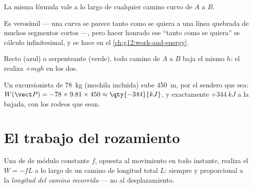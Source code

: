 \begin{proposition}\label{prop:g11:work-of-force:anypath}
La misma fórmula vale a lo largo de cualquier camino curvo de $A$ a $B$.
\end{proposition}
\admitted

\begin{remark}\label{rem:g11:work-of-force:anypath}
Es verosímil --- una curva se parece tanto como se quiera a una línea
quebrada de muchos segmentos cortos ---, pero hacer honrado ese ``tanto
como se quiera'' es cálculo infinitesimal, y se hace en el
\cref{ch:g12:work-and-energy}.
\end{remark}

\begin{omfigure}

{\small Recto (azul) o serpenteante (verde), todo camino de $A$ a $B$
baja el mismo $h$: el  realiza $+mgh$ en los dos.}
\end{omfigure}

\begin{example}[Excursionista]\label{ex:g11:work-of-force:hiker}
Un excursionista de \qty{78}{kg} (mochila incluida) sube \qty{450}{m},
por el sendero que sea:
$W(\vect P) = -78 \times 9.81 \times 450 \approx \qty{-344}{kJ}$, y
exactamente $+\qty{344}{kJ}$ a la bajada, con los rodeos que sean.
\end{example}

\section{El trabajo del rozamiento}

\begin{proposition}\label{prop:g11:work-of-force:friction}
Una  de  de módulo constante $f$, opuesta al movimiento
en todo instante, realiza el  $W = -fL$ a lo largo de un camino
de longitud total $L$: siempre  y proporcional a la
\emph{longitud del camino recorrido} --- no al desplazamiento.
\end{proposition}


